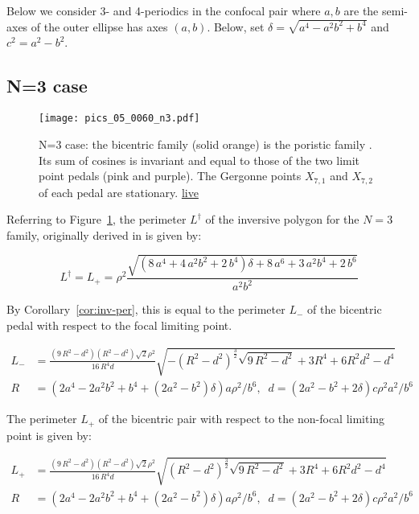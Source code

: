 Below we consider 3- and 4-periodics in the confocal pair where $a,b$ are the semi-axes of the outer ellipse has axes $(a,b)$. Below, set $\delta=\sqrt{a^4-a^2 b^2+b^4}$ and $c^2=a^2-b^2$.

\subsection{N=3 case}

\begin{figure}
    \centering
    \texttt{[image: pics\_05\_0060\_n3.pdf]}
    \caption{N=3 case: the bicentric family (solid orange) is the poristic family \cite{gallatly1914-geometry}. Its sum of cosines is invariant and equal to those of the two limit point pedals (pink and purple). The Gergonne points $X_{7,1}$ and $X_{7,2}$ of each pedal are stationary. \href{https://bit.ly/379HU8l}{live}}
    \label{fig:n3}
\end{figure}

Referring to Figure~\ref{fig:n3}, the perimeter $L^\dagger$ of the inversive polygon for the $N=3$ family, originally derived in  \cite[Prop. 4]{reznik2020-n3-focus-inversive} is given by:


\[L^\dagger=L_+=\rho^2 \frac {\sqrt { \left( 8\,{a}^{4}+4\,{a}^{2}{b}^{2}+2\,{b}^{4}
 \right) \delta+8\,{a}^{6}+3\,{a}^{2}{b}^{4}+2\,{b}^{6}}}{{a}^{2}{b}^{
2}}\]

By Corollary~\ref{cor:inv-per}, this is equal to the perimeter $L_-$ of the bicentric pedal with respect to the focal limiting point.

\begin{align*}
    L_{-} &= {\frac {  \left( 9\,{R}^{2}-{d}^{2} \right)  \left( {R}^{2}-{d}^{2}
 \right) \sqrt {2}\rho^2}{16\,{R}^{4}d}\sqrt {- \left( {R}^{2}-{d}^{2}
 \right) ^{{\frac{3}{2}}}\sqrt {9\,{R}^{2}-{d}^{2}}+ 3R^4 + 6R^2d^2 - d^4}}\\
R&=(2a^4 - 2a^2b^2 + b^4 + (2a^2 -b^2)\delta  )a\rho^2/b^6,\;\;
d=(2a^2 - b^2 + 2\delta)c\rho^2a^2/b^6
\end{align*}

The perimeter $L_+$ of the bicentric pair with respect to the non-focal limiting point is given by:

\begin{align*}
    L_{+} &= {\frac { \left( 9\,{R}^{2}-{d}^{2} \right)  \left( {R}^{2}-{d}^{2}
 \right) \sqrt {2}\rho^2}{16\,{R}^{4}d}\sqrt { \left( {R}^{2}-{d}^{2}
 \right) ^{{\frac{3}{2}}}\sqrt {9\,{R}^{2}-{d}^{2}}+ 3R^4 + 6R^2d^2 - d^4}}\\
R&=(2a^4 - 2a^2b^2 + b^4 + (2a^2 -b^2)\delta  )a\rho^2/b^6,\;\;
d=(2a^2 - b^2 + 2\delta)c\rho^2a^2/b^6
\end{align*}


